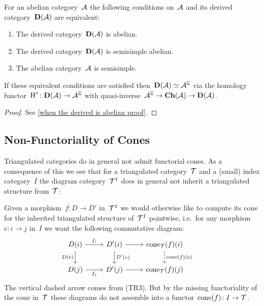 \documentclass[a4paper,10pt]{scrartcl}
\begin{document}
\begin{proposition}
  \label{when the derived is abelian}
  For an abelian category~$\mathcal{A}$ the following conditions on~$\mathcal{A}$ and its derived category~$\mathbf{D}(\mathcal{A})$ are equivalent:
  \begin{enumerate}
    \item
      \label{derived is abelian}
      The derived category~$\mathbf{D}(\mathcal{A})$ is abelian.
    \item
      \label{derived is semisimple abelian}
      The derived category~$\mathbf{D}(\mathcal{A})$ is semisimple abelian.
    \item
      \label{original is semisimple}
      The abelian category~$\mathcal{A}$ is semisimple.
  \end{enumerate}
  If these equivalent conditions are satisfied then~$\mathbf{D}(\mathcal{A}) \simeq \mathcal{A}^{\mathbb{Z}}$ via the homology functor~$\operatorname{H}^* \colon \mathbf{D}(\mathcal{A}) \to \mathcal{A}^{\mathbb{Z}}$ with quasi-inverse~$\mathcal{A}^{\mathbb{Z}} \to \mathbf{Ch}(\mathcal{A}) \to \mathbf{D}(\mathcal{A})$.
\end{proposition}


\begin{proof}
  See \cref{when the derived is abelian proof}.
\end{proof}



\subsection{Non-Functoriality of Cones}

Triangulated categories do in general not admit functorial cones.
As a consequence of this we see that for a triangulated category~$\mathcal{T}$ and a (small) index category~$I$ the diagram category~$\mathcal{T}^I$ does in general not inherit a triangulated structure from~$\mathcal{T}$:

Given a morphism~$f \colon D \to D'$ in~$\mathcal{T}^I$ we would otherwise like to compute its cone for the inherited triangulated structure of~$\mathcal{T}^I$ pointwise, i.e.\ for any morphism~$e \colon i \to j$ in~$I$ we want the following commutative diagram:
\[
  \begin{tikzcd}
    D(i)
    \arrow{r}[above]{f_i}
    \arrow{d}[left]{D(e)}
    &
    D'(i)
    \arrow{d}[right]{D'(e)}
    \arrow{r}
    &
    \cone_{\Tcat}(f)(i)
    \arrow[dashed]{d}[right]{\cone(f)(e)}
    \\
    D(j)
    \arrow{r}[below]{f_j}
    &
    D'(j)
    \arrow{r}
    &
    \cone_{\Tcat}(f)(j)
    &
  \end{tikzcd}
\]
The vertical dashed arrow comes from (TR3).
But by the missing functoriality of the cone in~$\mathcal{T}$ these diagrams do not assemble into a functor~$\operatorname{cone}(f) \colon I \to \mathcal{T}$.
\end{document}
